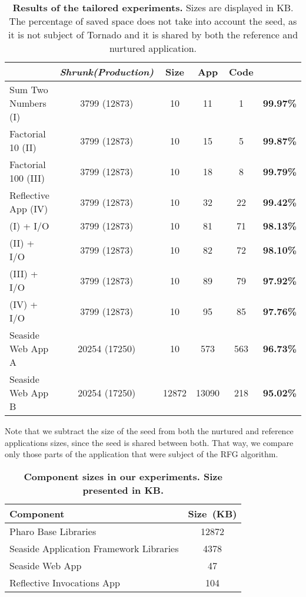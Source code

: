 \begin{description}
\begin{table}[ht]
\begin{tabular}{|l|cccc>{\columncolor[gray]{0.8}}c|}
 			& \textbf{\emph{Shrunk(Production)}}
			& \textbf{Size}
			& \textbf{App}
			& \textbf{Code}
			& \textbf{}\\
		\hline
		Sum Two Numbers (I)
 			&  3799 (12873) & 10 & 11 & 1 & \textbf{99.97\%}\\
		\hline
		Factorial 10 (II)
 			& 3799 (12873) & 10 & 15 & 5 & \textbf{99.87\%}\\
		\hline
		Factorial 100 (III)
 			& 3799 (12873) & 10 & 18 & 8 & \textbf{99.79\%}\\
		\hline
		Reflective App (IV)
 			& 3799 (12873) & 10 & 32 & 22 & \textbf{99.42\%}\\
		\hline
		(I) + I/O
 			& 3799 (12873) & 10 & 81 & 71 & \textbf{98.13\%}\\
		\hline
		(II) + I/O
 			& 3799 (12873) & 10 & 82 & 72 & \textbf{98.10\%}\\
		\hline
		(III) + I/O
 			& 3799 (12873) & 10 & 89 & 79 & \textbf{97.92\%}\\
		\hline
		(IV) + I/O
 			& 3799 (12873) & 10 & 95 & 85 & \textbf{97.76\%}\\
		\hline
		Seaside Web App A
 			& 20254 (17250) & 10 & 573 & 563 & \textbf{96.73\%}\\
		\hline
		Seaside Web App B
 			& 20254 (17250) & 12872 & 13090 & 218 & \textbf{95.02\%}\\
		\hline
 	\end{tabular}
 	\caption{\small\textbf{Results of the tailored experiments.} Sizes are displayed in KB. The percentage of saved space does not take into account the seed, as it is not subject of Tornado and it is shared by both the reference and nurtured application.}
 	\label{tb:results}
 \end{table}


Note that we subtract the size of the seed from both the nurtured and reference applications sizes, since the seed is shared between both. That way, we compare only those parts of the application that were subject of the RFG algorithm.

\end{description}

 \begin{table}[ht]
 \small
 	\centering
 	\begin{tabular}{|lc|}
			\hline
			\textbf{Component}
 			& \textbf{Size~(KB)}\\
		\hline
		Pharo Base Libraries & 12872\\\hline
		Seaside Application Framework Libraries & 4378\\\hline
		Seaside Web App & 47\\\hline
		Reflective Invocations App & 104\\\hline
 	\end{tabular}
 	\caption{\small\textbf{Component sizes in our experiments. Size presented in KB.} \label{tb:tailored_components}}
 	\label{tb:basic_sizes}
 \end{table}

